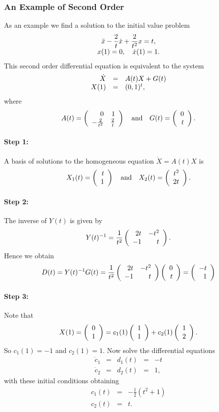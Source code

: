 \documentclass{ximera}
\begin{document}
\subsubsection*{An Example of Second Order}

As an example we find a solution to the initial value
problem 
\begin{equation}
\label{E:2ndorderex}
\begin{array}{c}
\displaystyle \ddot x - \frac{2}{t} \dot x + \frac{2}{t^2} x = t,\\
\displaystyle x(1) = 0,\quad \dot x(1) = 1.
\end{array}
\end{equation}
This second order differential equation is equivalent to the system
\begin{equation}  \label{E:2ndexam}
\begin{array}{rcl}
\displaystyle \dot{X} & = & A(t) X + G(t) \\
\displaystyle X(1) & = & (0,1)^t,
\end{array}
\end{equation}
where 
\[
A(t) = \left(\begin{array}{rr} 0 & 1\\ -\frac{2}{t^2} &\frac{2}{t}\end{array}\right)\quad\mbox{and}\quad G(t) = \left(\begin{array}{r} 0 \\ t\end{array}\right).
\]

\paragraph{Step 1:}  A basis of solutions 
to the homogeneous equation $\dot X = A(t)X$ is
\[
X_1(t) = \left(\begin{array}{r} t \\ 1\end{array}\right) \quad\mbox{and}\quad X_2(t) = \left(\begin{array}{r} t^2 \\ 2t\end{array}\right).
\]

\paragraph{Step 2:}  The inverse of $Y(t)$ is given by
\[
Y(t)^{-1} = \frac{1}{t^2} \left(\begin{array}{rr} 2t & -t^2\\ -1 &t\end{array}\right).
\]
Hence we obtain
\[
D(t) = Y(t)^{-1} G(t) = \frac{1}{t^2} \left(\begin{array}{rr} 2t & -t^2\\ -1 &t\end{array}\right)\left(\begin{array}{r} 0 \\ t\end{array}\right)  
= \left(\begin{array}{r} -t \\ 1\end{array}\right)
\]

\paragraph{Step 3:} Note that 
\[
X(1) = \left(\begin{array}{r} 0 \\ 1\end{array}\right) = c_1(1)\left(\begin{array}{r} 1 \\ 1\end{array}\right) + c_2(1)\left(\begin{array}{r} 1 \\ 2\end{array}\right).
\]
So $c_1(1)=-1$ and $c_2(1)=1$.  Now solve the differential equations
\[
\begin{array}{rclcl}
\dot{c}_1 & = & d_1(t) & = & -t \\
\dot{c}_2 & = & d_2(t) & = & 1,
\end{array}
\]
with these initial conditions obtaining
\begin{eqnarray*}
c_1(t) & = & -\frac{1}{2}(t^2+1) \\
c_2(t) & = & t.
\end{eqnarray*}
\end{document}
